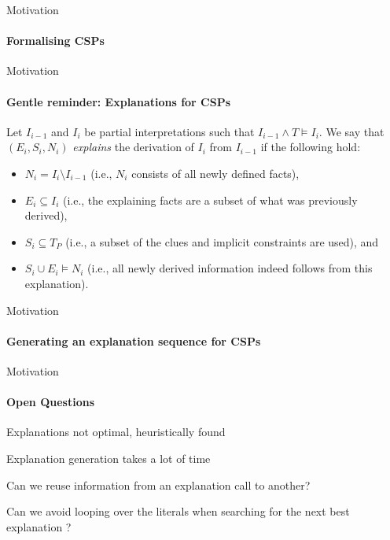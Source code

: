 \documentclass{beamer}
\begin{document}
\begin{frame}{Motivation}
	\framesubtitle{Formalising CSPs}
	
\end{frame}




\begin{frame}{Motivation}
	\framesubtitle{Gentle reminder: Explanations for CSPs}
	 \begin{definition}
		Let $I_{i-1}$ and $I_i$ be partial interpretations such that $I_{i-1}\wedge T \models I_i$.
		We say that $(E_i,S_i,N_i)$ \emph{explains} the derivation of $I_{i}$ from $I_{i-1}$ if the following hold:
		\begin{itemize}
			\item $N_i= I_i \setminus I_{i-1}$ (i.e., $N_i$ consists of all newly defined facts), 
			\item $E_i\subseteq I_i$ (i.e., the explaining facts are a subset of what was previously derived),
			\item $S_i \subseteq T_P$ (i.e., a subset of the clues and implicit constraints are used), and 
			\item $S_i \cup E_i \models N_i$ (i.e., all newly derived information indeed follows from this explanation).
		\end{itemize}
	\end{definition}
\end{frame}

\begin{frame}{Motivation}
	\framesubtitle{Generating an explanation sequence for CSPs}
	
\end{frame}

\begin{frame}{Motivation}
	\framesubtitle{Open Questions}

   \begin{description}[font=\color{vuborange}\itshape]
	\item[\hspace{0.9cm}Optimality] Explanations not optimal, heuristically found
	\item[\hspace{1.05cm}Efficiency] Explanation generation takes a lot of time
	\item[\hspace{0.3cm}Incrementality] Can we reuse information from an explanation call to another?
	\item[Constrainedness] Can we avoid looping over the literals when searching for the next best explanation ?
   \end{description}
\end{frame}
\end{document}
